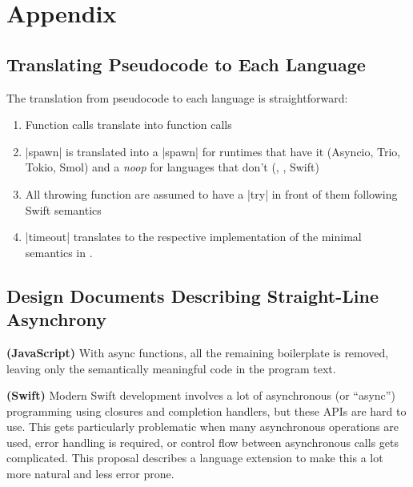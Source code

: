 \appendix
\section{Appendix}

\subsection{Translating Pseudocode to Each Language}

The translation from pseudocode to each language is straightforward:

\begin{enumerate}
  \item Function calls translate into function calls
  \item \code|spawn| is translated into a \code|spawn| for runtimes that have it (Asyncio, Trio, Tokio, Smol) and a \emph{noop} for languages that don't (\CSharp, \Js, Swift)
  \item All throwing function are assumed to have a \code|try| in front of them following Swift semantics
  \item  \code|timeout| translates to the respective implementation of the minimal semantics in .
\end{enumerate}

\subsection{Design Documents Describing Straight-Line Asynchrony}
\label{app:design-docs}

\begin{displayquote}%
  \textbf{(JavaScript)} With async functions, all the remaining boilerplate is removed, leaving only the semantically meaningful code in the program text.~\cite{ecma_tc_39_tc39_2016}
\end{displayquote}

\begin{displayquote}%
  \textbf{(Swift)} Modern Swift development involves a lot of asynchronous (or ``async'') programming using closures and completion handlers, but these APIs are hard to use. This gets particularly problematic when many asynchronous operations are used, error handling is required, or control flow between asynchronous calls gets complicated. This proposal describes a language extension to make this a lot more natural and less error prone.~\cite{mccall_swift_2020}
\end{displayquote}


